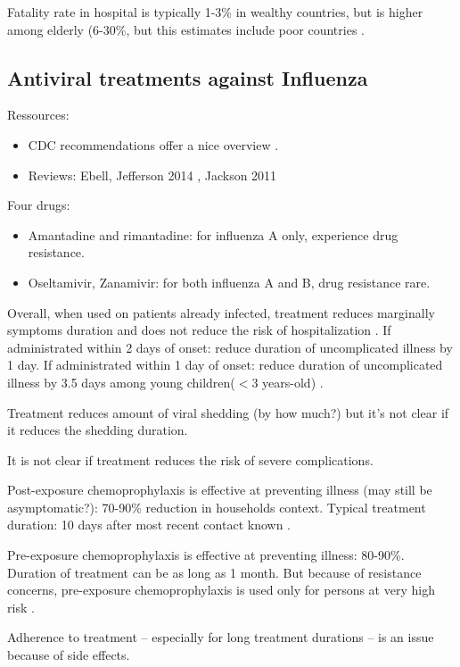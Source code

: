 \documentclass[11pt, onecolumn]{article}
\begin{document}
Fatality rate in hospital is typically 1-3\% in wealthy countries, but is higher among elderly (6-30\%, but this estimates include poor countries \cite{Wong:2015bb}.


\subsection{Antiviral treatments against Influenza }
\label{sec:antiviral}
Ressources:
\begin{itemize}
\item  CDC recommendations offer a nice overview \cite{CDC:2011wq}.
\item Reviews: Ebell\cite{Ebell:2014ic},  Jefferson 2014 \cite{Jefferson:2014ei}, Jackson 2011 \cite{Jackson:2011ff}
\end{itemize}

Four drugs: 
\begin{itemize}
\item Amantadine and rimantadine: for influenza A only, experience drug resistance.
\item Oseltamivir, Zanamivir: for both influenza A and B, drug resistance rare.
\end{itemize}

Overall, when used on patients already infected, treatment reduces marginally symptoms duration and does not reduce the risk of hospitalization \cite{Ebell:2014ic,Jefferson:2014ei}. 
If administrated within 2 days of onset: reduce duration of uncomplicated illness by 1 day.
If administrated within 1 day of onset: reduce duration of uncomplicated illness by 3.5 days among young children($<3$ years-old) \cite{CDC:2011wq}.

Treatment reduces amount of viral shedding (by how much?) but it's not clear if it reduces the shedding duration.

It is not clear if treatment reduces the risk of severe complications.

Post-exposure chemoprophylaxis is effective at preventing illness (may still be asymptomatic?): 70-90\% reduction in households context. Typical treatment duration: 10 days after most recent contact known \cite{CDC:2011wq}.

Pre-exposure chemoprophylaxis is effective at preventing illness: 80-90\%. Duration of treatment can be as long as 1 month. But because of resistance concerns, pre-exposure chemoprophylaxis is used only for persons at very high risk \cite{CDC:2011wq}. 

Adherence to treatment -- especially for long treatment durations -- is an issue because of side effects.
\end{document}
